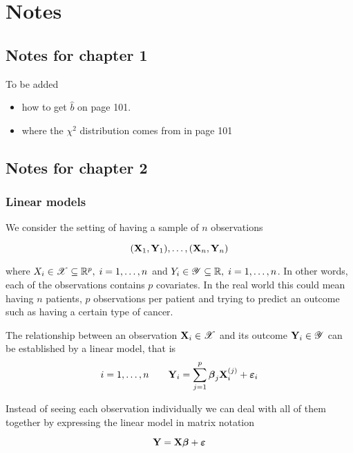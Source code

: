 \chapter{Notes}

\section{Notes for chapter 1}
To be added
\begin{itemize}
    \item how to get $\hat b$ on page 101.
    \item where the $\chi^2$ distribution comes from in page 101
\end{itemize}

\section{Notes for chapter 2}

\subsection{Linear models}

We consider the setting of having a sample of $n$ observations

\[
    (\mathbf{X}_1, \mathbf{Y}_1), \ldots ,(\mathbf{X}_n, \mathbf{Y}_n)
\]

where $X_i \in \mathscr{X} \subseteq \mathbb{R}^p, \; i = 1, \ldots, n$ and $Y_i \in \mathscr{Y} \subseteq \mathbb{R}, \; i = 1, \ldots, n$. In other words, each of the observations contains $p$ covariates. In the real world this could mean having $n$ patients, $p$ observations per patient and trying to predict an outcome such as having a certain type of cancer.

\begin{definition}
    The relationship between an observation $\mathbf{X}_i \in \mathscr{X}$ and its outcome $\mathbf{Y}_i \in \mathscr{Y}$ can be established by a linear model, that is
    \begin{equation}
        i = 1, \ldots, n \qquad \mathbf{Y}_{i} = \sum_{j=1}^{p} \boldsymbol{\beta}_{j} \mathbf{X}_{i}^{(j)} + \boldsymbol{\varepsilon}_{i}
    \end{equation}
\end{definition}

Instead of seeing each observation individually we can deal with all of them together by expressing the linear model in matrix notation

\begin{equation}
    \label{eqn: linear model (matrix)}
    \mathbf{Y} = \mathbf{X} \boldsymbol{\beta} + \boldsymbol{\varepsilon}
\end{equation}

